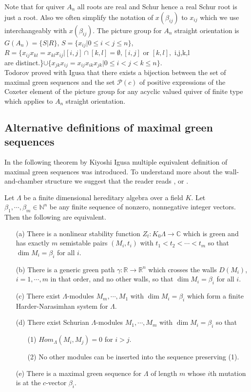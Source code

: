 \indent Note that for quiver $A_n$ all roots are real and Schur hence a real Schur root is just a root. Also we often simplify the notation of $x(\beta_{ij})$ to $x_{ij}$ which we use interchangeably with $x(\beta_{ij})$. The picture group for $A_n$ straight orientation is $G(A_n)=\{S|R\}$, $S=\{x_{ij}|0\leq i<j\leq n\}$, $R=\{x_{ij}x_{kl}=x_{kl}x_{ij}|[i,j]\cap[k,l]=\emptyset, [i,j]\text{ or }[k,l], $ i,j,k,l \\are distinct.\}$\cup\{x_{jk}x_{ij}=x_{ij}x_{ik}x_{jk}|0\leq i<j<k\leq n\}$.\\
\indent Todorov proved with Igusa \cite{IT17} that there exists a bijection between the set of maximal green sequences and the set $\mathcal{P}(c)$ of positive expressions of the Coxeter element of the picture group for any acyclic valued quiver of finite type which applies to $A_n$ straight orientation.\\
\subsection{Alternative definitions of maximal green sequences}
\indent In the following theorem by Kiyoshi Igusa multiple equivalent definition of maximal green sequences was introduced. To understand more about the wall-and-chamber structure we suggest that the reader reads \cite{IOTW15}, \cite{GHKK14} or \cite{BST17}.
\begin{theorem}
\cite{I17} Let $\Lambda$ be a finite dimensional hereditary algebra over a field $K$. Let $\beta_1,\cdots,\beta_m\in \mathbb{N}^n$ be any finite sequence of nonzero, nonnegative integer vectors. Then the following are equivalent.\label{thm:3}
\begin{enumerate}
\item[(a)] There is a nonlinear stability function $Z_t:K_0\Lambda\to \mathbb{C}$ which is green and has exactly $m$ semistable pairs $(M_i,t_i)$ with $t_1<t_2<\cdots<t_m$ so that $\dim M_i=\beta_i$ for all $i$.%
\item[(b)] There is a generic green path $\gamma:\mathbb{R}\to\mathbb{R}^n$ which crosses the walls $D(M_i)$, $i=1,\cdots,m$ in that order, and no other walls, so that $\dim M_i=\beta_i$ for all $i$.
\item[(c)] There exist $\Lambda$-modules $M_m,\cdots,M_1$ with $\dim M_i=\beta_i$ which form a finite Harder-Narasimhan system for $\Lambda$. 
\item[(d)] There exist Schurian $\Lambda$-modules $M_1,\cdots,M_m$ with $\dim M_i=\beta_i$ so that \begin{enumerate}
\item[(1)] $Hom_\Lambda(M_i,M_j)=0$ for $i>j$.
\item[(2)] No other modules can be inserted into the sequence preserving (1).
\end{enumerate}
\item[(e)] There is a maximal green sequence for $\Lambda$ of length $m$ whose $i$th mutation is at the $c$-vector $\beta_i$. 
\end{enumerate}
\end{theorem}
